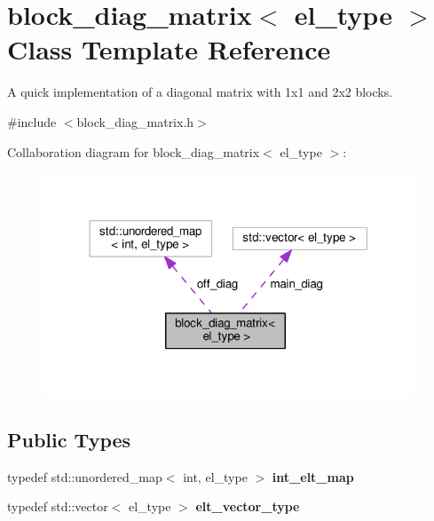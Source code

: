 \hypertarget{classblock__diag__matrix}{}\section{block\+\_\+diag\+\_\+matrix$<$ el\+\_\+type $>$ Class Template Reference}
\label{classblock__diag__matrix}


A quick implementation of a diagonal matrix with 1x1 and 2x2 blocks.  




{\ttfamily \#include $<$block\+\_\+diag\+\_\+matrix.\+h$>$}



Collaboration diagram for block\+\_\+diag\+\_\+matrix$<$ el\+\_\+type $>$\+:
\nopagebreak
\begin{figure}[H]
\begin{center}
\leavevmode
\includegraphics[width=314pt]{classblock__diag__matrix__coll__graph}
\end{center}
\end{figure}
\subsection*{Public Types}
\begin{DoxyCompactItemize}
\item 
typedef std\+::unordered\+\_\+map$<$ int, el\+\_\+type $>$ {\bfseries int\+\_\+elt\+\_\+map}\hypertarget{classblock__diag__matrix_a83f8d88c5e6d2bdaee582cad484cc793}{}\label{classblock__diag__matrix_a83f8d88c5e6d2bdaee582cad484cc793}

\item 
typedef std\+::vector$<$ el\+\_\+type $>$ {\bfseries elt\+\_\+vector\+\_\+type}\hypertarget{classblock__diag__matrix_ab9eac6089c211c3332e3e3acc2c5dd89}{}\label{classblock__diag__matrix_ab9eac6089c211c3332e3e3acc2c5dd89}

\end{DoxyCompactItemize}

